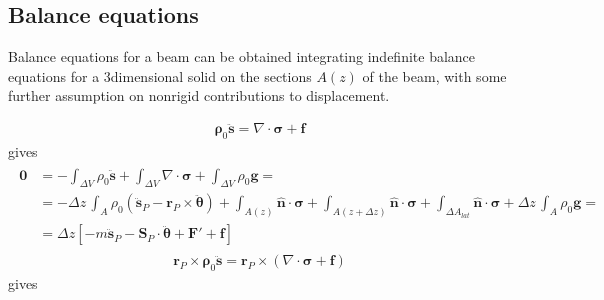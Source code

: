 \documentclass[letterpaper,10pt,english]{jupyterBook}
\begin{document}
\subsection{Balance equations}
\label{\detokenize{ch/solids/beams/timoshenko:balance-equations}}
\sphinxAtStartPar
Balance equations for a beam can be obtained integrating indefinite balance equations for a 3\sphinxhyphen{}dimensional solid on the sections \(A(z)\) of the beam, with some further assumption on non\sphinxhyphen{}rigid contributions to displacement.

\sphinxAtStartPar
{}
\begin{equation*}
\begin{split}\mathbf{\rho}_0 \ddot{\mathbf{s}} = \nabla \cdot \boldsymbol\sigma + \mathbf{f}\end{split}
\end{equation*}
\sphinxAtStartPar
gives
\begin{equation*}
\begin{split}\begin{aligned}
  \mathbf{0} 
& = - \int_{\Delta V} \rho_0 \ddot{\mathbf{s}} + \int_{\Delta V} \nabla \cdot \boldsymbol\sigma + \int_{\Delta V} \rho_0 \mathbf{g} = \\
& = - \Delta z \, \int_{A} \rho_0 \left( \ddot{\mathbf{s}}_P - \mathbf{r}_P \times \ddot{\boldsymbol{\theta}} \right)
    + \int_{A(z)} \hat{\mathbf{n}} \cdot \boldsymbol\sigma + \int_{A(z+\Delta z)} \hat{\mathbf{n}} \cdot \boldsymbol\sigma + \int_{\Delta A_{lat}} \hat{\mathbf{n}} \cdot \boldsymbol\sigma + \Delta z \, \int_{A} \rho_0 \mathbf{g} = \\
& = \Delta z \left[ - m \ddot{\mathbf{s}}_P - \mathbf{S}_{P} \cdot \ddot{\boldsymbol\theta} + \mathbf{F}' + \mathbf{f} \right]
\end{aligned}\end{split}
\end{equation*}
\sphinxAtStartPar
{}
\begin{equation*}
\begin{split}\mathbf{r}_P \times \mathbf{\rho}_0 \ddot{\mathbf{s}} = \mathbf{r}_P \times \left( \nabla \cdot \boldsymbol\sigma + \mathbf{f} \right)\end{split}
\end{equation*}
\sphinxAtStartPar
gives
\end{document}
